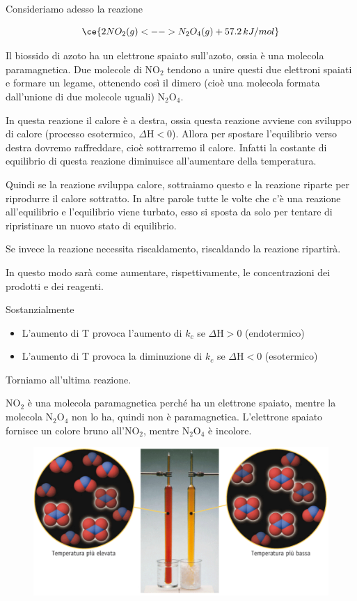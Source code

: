 Consideriamo adesso la reazione

$$\ce{2NO_2(g) <--> N_2O_4(g) + 57.2 \, kJ/mol}$$

Il biossido di azoto ha un elettrone spaiato sull'azoto, ossia è una molecola paramagnetica. Due molecole di NO$_2$ tendono a unire questi due elettroni spaiati e formare un legame, ottenendo così il dimero (cioè una molecola formata dall'unione di due molecole uguali) N$_2$O$_4$.

In questa reazione il calore è a destra, ossia questa reazione avviene con sviluppo di calore (processo esotermico, $\Delta$H$<$0). Allora per spostare l'equilibrio verso destra dovremo raffreddare, cioè sottrarremo il calore. Infatti la costante di equilibrio di questa reazione diminuisce all'aumentare della temperatura.

Quindi se la reazione sviluppa calore, sottraiamo questo e la reazione riparte per riprodurre il calore sottratto. In altre parole tutte le volte che c'è una reazione all'equilibrio e l'equilibrio viene turbato, esso si sposta da solo per tentare di ripristinare un nuovo stato di equilibrio.

Se invece la reazione necessita riscaldamento, riscaldando la reazione ripartirà.

In questo modo sarà come aumentare, rispettivamente, le concentrazioni dei prodotti e dei reagenti.

Sostanzialmente

\begin{itemize}
    \item L'aumento di T provoca l'aumento di $k_c$ se $\Delta$H$>$0 (endotermico)
    \item L'aumento di T provoca la diminuzione di $k_c$ se $\Delta$H$<$0 (esotermico)
\end{itemize}

Torniamo all'ultima reazione.

NO$_2$ è una molecola paramagnetica perché ha un elettrone spaiato, mentre la molecola N$_2$O$_4$ non lo ha, quindi non è paramagnetica. L'elettrone spaiato fornisce un colore bruno all'NO$_2$, mentre N$_2$O$_4$ è incolore.

\begin{figure}[htp]
    \centering
    \includegraphics[width=14cm]{immagini/reazione_NO_2.png}
\end{figure}

